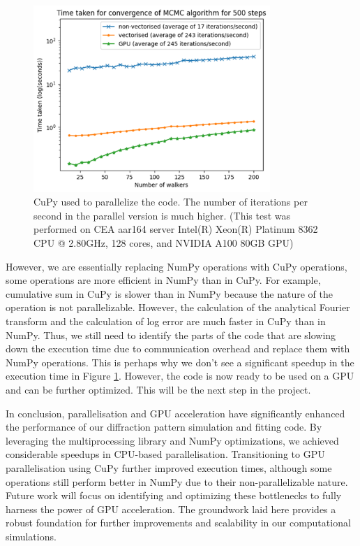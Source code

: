 \begin{figure}[h]
    \centering
    \includegraphics[width=0.8\textwidth]{images/gpu.png}
    \caption{CuPy used to parallelize the code. The number of iterations per second in the parallel version is much higher. (This test was performed 
    on CEA aar164 server Intel(R) Xeon(R) Platinum 8362 CPU @ 2.80GHz, 128 cores, and NVIDIA A100 80GB GPU)}
    \label{fig:cupy}
\end{figure}

\FloatBarrier

However, we are essentially replacing NumPy operations with CuPy operations, some operations 
are more efficient in NumPy than in CuPy. For example, cumulative sum in CuPy is slower than in 
NumPy because the nature of the operation is not parallelizable. However, the calculation of the 
analytical Fourier transform and the calculation of log error are much faster in CuPy than in 
NumPy. Thus, we still need to identify the parts of the code that are slowing down the execution 
time due to communication overhead and replace them with NumPy operations. This is perhaps why 
we don't see a significant speedup in the execution time in Figure \ref{fig:cupy}. However, the 
code is now ready to be used on a GPU and can be further optimized. This will be the next step 
in the project.

\medskip

In conclusion, parallelisation and GPU acceleration have significantly enhanced the performance
 of our diffraction pattern simulation and fitting code. By leveraging the multiprocessing 
 library and NumPy optimizations, we achieved considerable speedups in CPU-based parallelisation. 
 Transitioning to GPU parallelisation using CuPy further improved execution times, although some
  operations still perform better in NumPy due to their non-parallelizable nature. Future work 
  will focus on identifying and optimizing these bottlenecks to fully harness the power of GPU 
  acceleration. The groundwork laid here provides a robust foundation for further improvements 
  and scalability in our computational simulations.


